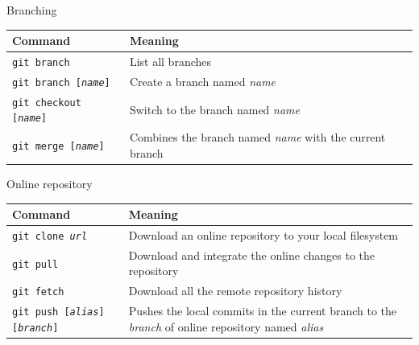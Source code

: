 \documentclass{beamer}
\newcommand{\cd}[1]{\texttt{#1}}
\begin{document}
\begin{frame}{Branching}
\begin{table}
    \scriptsize
    \centering
    \begin{tabular}{p{}p{}}
        \toprule
        \alert{Command}	&	\alert{Meaning}\\
        \midrule
        \cd{git branch}	&	List all branches\\
        \cd{git branch [\textit{name}]}	&	Create a branch named \textit{name}\\
        \cd{git checkout [\textit{name}]}	&	Switch to the branch named \textit{name}\\
        \cd{git merge [\textit{name}]}	&	Combines the branch named \textit{name} with the current branch\\
        \bottomrule
        \end{tabular}
    \end{table}
\end{frame}

\begin{frame}{Online repository}
\begin{table}
    \scriptsize
    \centering
    \begin{tabular}{p{}p{}}
        \toprule
        \alert{Command}	&	\alert{Meaning}\\
        \midrule
        \cd{git clone \textit{url}}	&	Download an online repository to your local filesystem\\
        \cd{git pull}	&	Download and integrate the online changes to the repository\\
        \cd{git fetch}	&	Download all the remote repository history\\
        \cd{git push [\textit{alias}] [\textit{branch}]}	& Pushes the local commits in the current branch to the \textit{branch} of online repository named \textit{alias}\\
        \bottomrule
        \end{tabular}
\end{table}
\end{frame}
\end{document}
